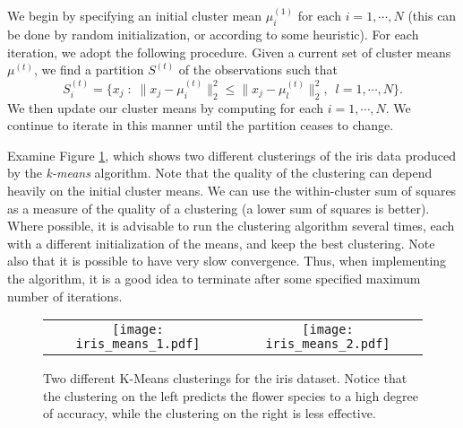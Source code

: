 We begin by specifying an initial cluster mean $\mu_i^{(1)}$ for each $i = 1, \cdots, N$ (this can be done by random initialization, or according to some heuristic).
For each iteration, we adopt the following procedure.
Given a current set of cluster means $\mu^{(t)}$, we find a partition $S^{(t)}$ of the observations such that
\begin{equation*}
S_{i}^{(t)} = \{x_j \; : \; \|x_j - \mu_{i}^{(t)}\|_2^2 \leq \|x_j - \mu_{l}^{(t)}\|_2^2,\,\,\,  l = 1, \cdots, N\}.
\end{equation*}
We then update our cluster means by computing for each $i = 1, \cdots, N$.
We continue to iterate in this manner until the partition ceases to change.



Examine Figure \ref{fig:iris_clusterings}, which shows two different clusterings of the iris data produced by the \emph{k-means} algorithm.
Note that the quality of the clustering can depend heavily on the initial cluster means.
We can use the within-cluster sum of squares as a measure of the quality of a clustering (a lower sum of squares is better).
Where possible, it is advisable to run the clustering algorithm several times, each with a different initialization of the means,
and keep the best clustering.
Note also that it is possible to have very slow convergence.
Thus, when implementing the algorithm, it is a good idea to terminate after some specified maximum number of iterations.

\begin{figure}[h]
	\centering
	\begin{tabular}{cc}
	\texttt{[image: iris\_means\_1.pdf]} &
	\texttt{[image: iris\_means\_2.pdf]}
	\end{tabular}
	\caption{Two different K-Means clusterings for the iris dataset.
            Notice that the clustering on the left predicts the flower species to a high degree of accuracy,
            while the clustering on the right is less effective.}
    \label{fig:iris_clusterings}
\end{figure}

